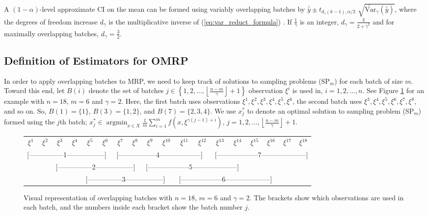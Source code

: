 \documentclass[12pt]{article}
\newcommand{\vartg}[1]{\widetilde{\mathrm{Var}}_\gamma \left( #1 \right)}
\newcommand{\x}{x}
\newcommand{\xs}{\x^*}
\newcommand{\xit}{\xi}
\newcommand{\xiti}{\xit^i}
\newcommand{\nb}{\left\lfloor\tfrac{n-m}{\gamma}\right\rfloor+1}
\newcommand{\gammab}{\bar{\gamma}}
\newcommand{\ogb}{\tfrac{1}{\gammab}}
\newcommand{\yb}{\bar{y}}
\newcommand{\ybb}{\bar{\yb}}
\DeclareMathOperator*{\argmin}{argmin}
\begin{document}
A $(1-\alpha)$-level approximate CI on the mean can be formed using variably overlapping batches by $\ybb \pm t_{d_{\gamma}(k-1),\alpha/2}$ $\sqrt{\vartg{\ybb}}$, where the degrees of freedom increase $d_{\gamma}$ is the multiplicative inverse of (\ref{eq:var_reduct_formula}) \citep{Welch1987}.  
If $\ogb$ is an integer, $d_{\gamma} = \frac{3}{2+\gammab^2}$ and for maximally overlapping batches, $d_{\gamma} = \frac{3}{2}$.
 

\subsection{Definition of Estimators for OMRP}
In order to apply overlapping batches to MRP, we need to keep track of solutions to sampling problems (SP$_m$) for each batch of size $m$.  
Toward this end, let $B(i)$ denote the set of batches $j \in \left\{1, 2, \dots, \nb \right\}$ observation $\xiti$ is used in, $i = 1, 2, \dots, n$.  
See Figure \ref{fig:overlap_nonint} for an example with $n=18$, $m = 6$ and $\gamma = 2$.  
Here, the first batch uses observations $\xit^1, \xit^2, \xit^3, \xit^4, \xit^5, \xit^6$, the second batch uses $\xit^3, \xit^4, \xit^5, \xit^6, \xit^7, \xit^8$, and so on.  
So, $B(1) = \{1\}$, $B(3) = \{1,2\}$, and $B(7)=\{2,3,4\}$.  
We use $\xs_j$ to denote an optimal solution to sampling problem (SP$_m$) formed using the $j$th batch; $\xs_j \in \argmin_{\x \in X} \frac{1}{m} \sum_{i=1}^m f(\x,\xit^{\gamma(j-1) + i})$, $j = 1, 2, \dots, \nb$.

\begin{figure}[htb!]
	\centering
	\begin{tabular}{*{18}{c}}
		$\xit^1$ & $\xit^2$ & $\xit^3$ & $\xit^4$ & $\xit^5$ & $\xit^6$ & $\xit^7$ & $\xit^8$ & $\xit^9$ & $\xit^{10}$ & $\xit^{11}$ & $\xit^{12}$ & $\xit^{13}$ & $\xit^{14}$ & $\xit^{15}$ & $\xit^{16}$ & $\xit^{17}$  & $\xit^{18}$ \\
		\multicolumn{6}{l}{[---------------1-----------------]} &
		\multicolumn{6}{l}{[-----------------4------------------]} &
		\multicolumn{6}{l}{[------------------7--------------------]} \\
		& & \multicolumn{6}{l}{[---------------2-----------------]} &
		\multicolumn{6}{l}{[------------------5--------------------]} \\
		& & & & \multicolumn{6}{l}{[---------------3-----------------]} &
		\multicolumn{6}{l}{[------------------6--------------------]} \\
	\end{tabular}
	\caption{Visual representation of overlapping batches with $n = 18$, $m = 6$ and $\gamma = 2$.  
        The brackets show which observations are used in each batch, and the numbers inside each bracket show the batch number $j$.}
	\label{fig:overlap_nonint}
\end{figure}
\end{document}
